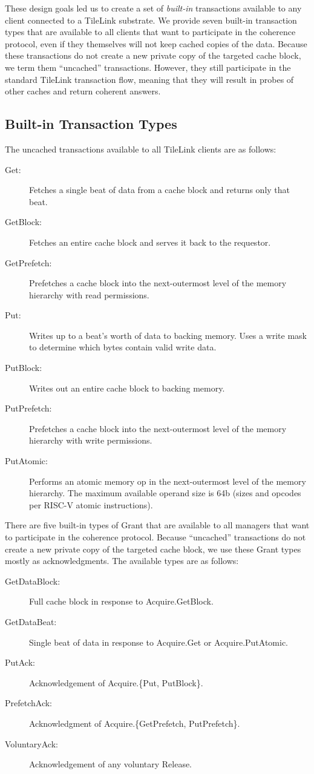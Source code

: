 These design goals led us to create a set of {\em built-in} transactions available to any client connected to a TileLink substrate.
We provide seven built-in transaction types that are available to all clients that want to participate in the coherence protocol, even if they themselves will not keep cached copies of the data.
Because these transactions do not create a new private copy of the targeted cache block, we term them ``uncached'' transactions. 
However, they still participate in the standard TileLink transaction flow, meaning that they will result in probes of other caches and return coherent answers.

\subsection{Built-in Transaction Types}

The uncached transactions available to all TileLink clients are as follows:
\begin{description}
\item[Get:] Fetches a single beat of data from a cache block and returns only that beat.
\item[GetBlock:] Fetches an entire cache block and serves it back to the requestor.
\item[GetPrefetch:]  Prefetches a cache block into the next-outermost level of the memory hierarchy with read permissions.
\item[Put:] Writes up to a beat's worth of data to backing memory. Uses a write mask to determine which bytes contain valid write data.
\item[PutBlock:] Writes out an entire cache block to backing memory.
\item[PutPrefetch:]  Prefetches a cache block into the next-outermost level of the memory hierarchy with write permissions.
\item[PutAtomic:] Performs an atomic memory op in the next-outermost level of the memory hierarchy. The maximum available operand size is 64b (sizes and opcodes per RISC-V atomic instructions).
\end{description}

There are five built-in types of Grant that are available to all managers that want to participate in the coherence protocol.
Because ``uncached'' transactions do not create a new private copy of the targeted cache block, we use these Grant types mostly as acknowledgments.
The available types are as follows:
\begin{description}
\item[GetDataBlock:] Full cache block in response to Acquire.GetBlock.
\item[GetDataBeat:] Single beat of data in response to Acquire.Get or Acquire.PutAtomic.
\item[PutAck:] Acknowledgement of Acquire.\{Put, PutBlock\}.
\item[PrefetchAck:] Acknowledgment of Acquire.\{GetPrefetch, PutPrefetch\}.
\item[VoluntaryAck:] Acknowledgement of any voluntary Release.
\end{description}

